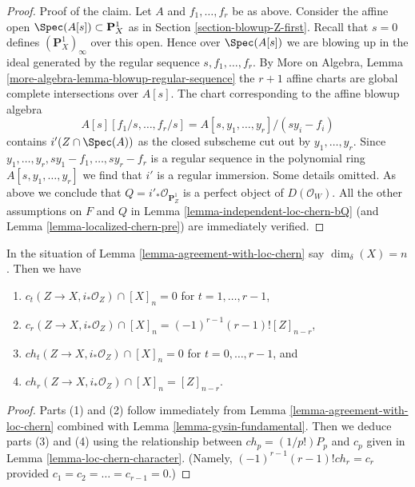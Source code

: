 \begin{proof}
\medskip\noindent
Proof of the claim. Let $A$ and $f_1, \ldots, f_r$ be as above.
Consider the affine open $\Spec(A[s]) \subset \mathbf{P}^1_X$
as in Section \ref{section-blowup-Z-first}. Recall that $s = 0$
defines $(\mathbf{P}^1_X)_\infty$ over this open. Hence over
$\Spec(A[s])$ we are blowing up in the ideal generated by
the regular sequence $s, f_1, \ldots, f_r$. By More on Algebra, Lemma
\ref{more-algebra-lemma-blowup-regular-sequence} the $r + 1$
affine charts are global complete intersections over $A[s]$.
The chart corresponding to the affine blowup algebra
$$
A[s][f_1/s, \ldots, f_r/s] = A[s, y_1, \ldots, y_r]/(sy_i - f_i)
$$
contains $i'(Z \cap \Spec(A))$ as the closed subscheme cut out by
$y_1, \ldots, y_r$. Since $y_1, \ldots, y_r, sy_1 - f_1, \ldots, sy_r - f_r$
is a regular sequence in the polynomial ring $A[s, y_1, \ldots, y_r]$
we find that $i'$ is a regular immersion. Some details omitted.
As above we conclude that $Q = i'_*\mathcal{O}_{\mathbf{P}^1_Z}$
is a perfect object of $D(\mathcal{O}_W)$. All the
other assumptions on $F$ and $Q$ in Lemma \ref{lemma-independent-loc-chern-bQ}
(and Lemma \ref{lemma-localized-chern-pre}) are immediately verified.
\end{proof}

\begin{lemma}
\label{lemma-actual-computation}
In the situation of Lemma \ref{lemma-agreement-with-loc-chern}
say $\dim_\delta(X) = n$. Then we have
\begin{enumerate}
\item $c_t(Z \to X, i_*\mathcal{O}_Z) \cap [X]_n = 0$ for
$t = 1, \ldots, r - 1$,
\item $c_r(Z \to X, i_*\mathcal{O}_Z) \cap [X]_n =
(-1)^{r - 1}(r - 1)![Z]_{n - r}$,
\item $ch_t(Z \to X, i_*\mathcal{O}_Z) \cap [X]_n = 0$ for
$t = 0, \ldots, r - 1$, and
\item $ch_r(Z \to X, i_*\mathcal{O}_Z) \cap [X]_n = [Z]_{n - r}$.
\end{enumerate}
\end{lemma}

\begin{proof}
Parts (1) and (2) follow immediately from
Lemma \ref{lemma-agreement-with-loc-chern}
combined with Lemma \ref{lemma-gysin-fundamental}.
Then we deduce parts (3) and (4) using the relationship
between $ch_p = (1/p!)P_p$ and $c_p$ given in
Lemma \ref{lemma-loc-chern-character}. (Namely,
$(-1)^{r - 1}(r - 1)!ch_r = c_r$ provided
$c_1 = c_2 = \ldots = c_{r - 1} = 0$.)
\end{proof}







